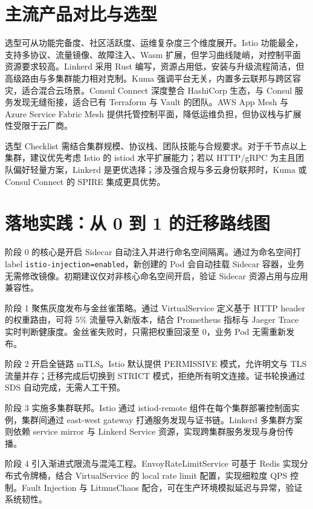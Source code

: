 \chapter{主流产品对比与选型}
选型可从功能完备度、社区活跃度、运维复杂度三个维度展开。Istio 功能最全，支持多协议、流量镜像、故障注入、Wasm 扩展，但学习曲线陡峭，对控制平面资源要求较高。Linkerd 采用 Rust 编写，资源占用低，安装与升级流程简洁，但高级路由与多集群能力相对克制。Kuma 强调平台无关，内置多云联邦与跨区容灾，适合混合云场景。Consul Connect 深度整合 HashiCorp 生态，与 Consul 服务发现无缝衔接，适合已有 Terraform 与 Vault 的团队。AWS App Mesh 与 Azure Service Fabric Mesh 提供托管控制平面，降低运维负担，但协议栈与扩展性受限于云厂商。\par
选型 Checklist 需结合集群规模、协议栈、团队技能与合规要求。对于千节点以上集群，建议优先考虑 Istio 的 istiod 水平扩展能力；若以 HTTP/gRPC 为主且团队偏好轻量方案，Linkerd 是更优选择；涉及强合规与多云身份联邦时，Kuma 或 Consul Connect 的 SPIRE 集成更具优势。\par
\chapter{落地实践：从 0 到 1 的迁移路线图}
阶段 0 的核心是开启 Sidecar 自动注入并进行命名空间隔离。通过为命名空间打 label \texttt{istio-injection=enabled}，新创建的 Pod 会自动挂载 Sidecar 容器，业务无需修改镜像。初期建议仅对非核心命名空间开启，验证 Sidecar 资源占用与应用兼容性。\par
阶段 1 聚焦灰度发布与金丝雀策略。通过 VirtualService 定义基于 HTTP header 的权重路由，可将 5\%{} 流量导入新版本，结合 Prometheus 指标与 Jaeger Trace 实时判断健康度。金丝雀失败时，只需把权重回滚至 0，业务 Pod 无需重新发布。\par
阶段 2 开启全链路 mTLS。Istio 默认提供 PERMISSIVE 模式，允许明文与 TLS 流量并存；迁移完成后切换到 STRICT 模式，拒绝所有明文连接。证书轮换通过 SDS 自动完成，无需人工干预。\par
阶段 3 实施多集群联邦。Istio 通过 istiod-remote 组件在每个集群部署控制面实例，集群间通过 east-west gateway 打通服务发现与证书链。Linkerd 多集群方案则依赖 service mirror 与 Linkerd Service 资源，实现跨集群服务发现与身份传播。\par
阶段 4 引入渐进式限流与混沌工程。EnvoyRateLimitService 可基于 Redis 实现分布式令牌桶，结合 VirtualService 的 local rate limit 配置，实现细粒度 QPS 控制。Fault Injection 与 LitmusChaos 配合，可在生产环境模拟延迟与异常，验证系统韧性。\par
